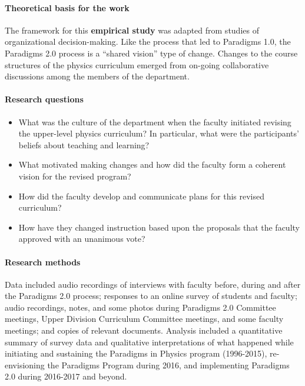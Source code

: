 \documentclass[aps,prstper,reprint]{revtex4-1}
\begin{document}
\paragraph*{Theoretical basis for the work}
The framework for this {\bf empirical study} was adapted from studies
of organizational decision-making\cite{beach2006leadership}.  Like the
process that led to Paradigms 1.0, the Paradigms 2.0 process is a
``shared vision'' type of change\cite{henderson2010}. Changes to the
course structures of the physics curriculum emerged from on-going collaborative discussions among the members of the department. 

\paragraph*{Research questions}
\begin{itemize}
\item What was the culture of the department when the faculty initiated revising the upper-level physics curriculum? In
  particular, what were the participants' beliefs about teaching and
  learning?
\item What motivated making changes and how did the faculty form a
  coherent vision for the revised program?
\item How did the faculty develop and communicate plans for this revised
  curriculum?
\item How have they changed instruction based upon the proposals that
  the faculty approved with an unanimous vote?
\end{itemize}
\paragraph*{Research methods}
Data included audio recordings of interviews with faculty before, during and after the Paradigms 2.0 process; responses to an online survey of students and faculty; audio recordings, notes, and some photos during Paradigms 2.0 Committee meetings, Upper Division Curriculum Committee meetings, and some faculty meetings; and copies of relevant documents. Analysis included a quantitative summary of survey data and qualitative interpretations of what happened while initiating and sustaining the Paradigms in Physics program (1996-2015), re-envisioning the Paradigms Program during 2016, and implementing Paradigms 2.0 during 2016-2017 and beyond.
\end{document}
